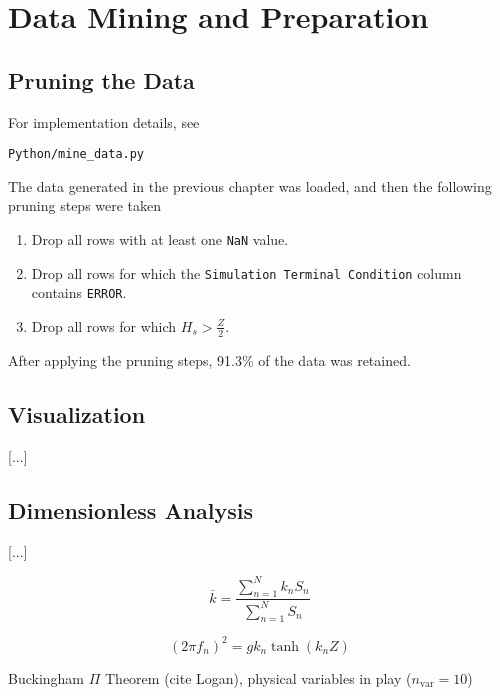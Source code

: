 \chapter{Data Mining and Preparation}

\section{Pruning the Data}

For implementation details, see

\begin{center}
	\texttt{Python/mine\_data.py}
\end{center}

The data generated in the previous chapter was loaded, and then the following pruning steps were taken

\begin{enumerate}
	\item Drop all rows with at least one \texttt{NaN} value.
	\item Drop all rows for which the \texttt{Simulation Terminal Condition} column contains \texttt{ERROR}.
	\item Drop all rows for which $H_s > \frac{Z}{2}$.
\end{enumerate}

\noindent After applying the pruning steps, 91.3\% of the data was retained.

\section{Visualization}

[...]

\section{Dimensionless Analysis}

[...]

\begin{equation}
	\overline{k} = \frac{\sum_{n=1}^{N}k_nS_n}{\sum_{n=1}^{N}S_n}
	\label{eqn:k_overline}
\end{equation}

\begin{equation}
	(2\pi f_n)^2 = gk_n\tanh(k_nZ)
	\label{eqn:Airy_dispersion}
\end{equation}

Buckingham $\Pi$ Theorem (cite Logan), physical variables in play ($n_\textrm{var} = 10$)

